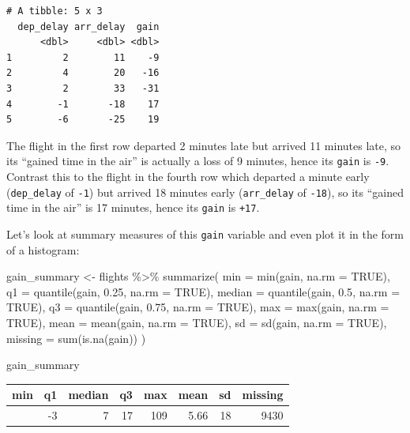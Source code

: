 \documentclass[
  letterpaper,
  DIV=11,
  numbers=noendperiod]{scrreprt}
\newenvironment{Shaded}{\begin{snugshade}}{\end{snugshade}}
\newcommand{\AttributeTok}[1]{\textcolor[rgb]{0.40,0.45,0.13}{#1}}
\newcommand{\ConstantTok}[1]{\textcolor[rgb]{0.56,0.35,0.01}{#1}}
\newcommand{\FloatTok}[1]{\textcolor[rgb]{0.68,0.00,0.00}{#1}}
\newcommand{\FunctionTok}[1]{\textcolor[rgb]{0.28,0.35,0.67}{#1}}
\newcommand{\NormalTok}[1]{\textcolor[rgb]{0.00,0.23,0.31}{#1}}
\newcommand{\OtherTok}[1]{\textcolor[rgb]{0.00,0.23,0.31}{#1}}
\newcommand{\SpecialCharTok}[1]{\textcolor[rgb]{0.37,0.37,0.37}{#1}}
\theoremstyle{definition}
\theoremstyle{remark}
\begin{document}
\begin{verbatim}
# A tibble: 5 x 3
  dep_delay arr_delay  gain
      <dbl>     <dbl> <dbl>
1         2        11    -9
2         4        20   -16
3         2        33   -31
4        -1       -18    17
5        -6       -25    19
\end{verbatim}

The flight in the first row departed 2 minutes late but arrived 11
minutes late, so its ``gained time in the air'' is actually a loss of 9
minutes, hence its \texttt{gain} is \texttt{-9}. Contrast this to the
flight in the fourth row which departed a minute early
(\texttt{dep\_delay} of \texttt{-1}) but arrived 18 minutes early
(\texttt{arr\_delay} of \texttt{-18}), so its ``gained time in the air''
is 17 minutes, hence its \texttt{gain} is \texttt{+17}.

Let's look at summary measures of this \texttt{gain} variable and even
plot it in the form of a histogram:

\begin{Shaded}
\begin{Highlighting}[]
\NormalTok{gain\_summary }\OtherTok{\textless{}{-}}\NormalTok{ flights }\SpecialCharTok{\%\textgreater{}\%} 
  \FunctionTok{summarize}\NormalTok{(}
    \AttributeTok{min =} \FunctionTok{min}\NormalTok{(gain, }\AttributeTok{na.rm =} \ConstantTok{TRUE}\NormalTok{),}
    \AttributeTok{q1 =} \FunctionTok{quantile}\NormalTok{(gain, }\FloatTok{0.25}\NormalTok{, }\AttributeTok{na.rm =} \ConstantTok{TRUE}\NormalTok{),}
    \AttributeTok{median =} \FunctionTok{quantile}\NormalTok{(gain, }\FloatTok{0.5}\NormalTok{, }\AttributeTok{na.rm =} \ConstantTok{TRUE}\NormalTok{),}
    \AttributeTok{q3 =} \FunctionTok{quantile}\NormalTok{(gain, }\FloatTok{0.75}\NormalTok{, }\AttributeTok{na.rm =} \ConstantTok{TRUE}\NormalTok{),}
    \AttributeTok{max =} \FunctionTok{max}\NormalTok{(gain, }\AttributeTok{na.rm =} \ConstantTok{TRUE}\NormalTok{),}
    \AttributeTok{mean =} \FunctionTok{mean}\NormalTok{(gain, }\AttributeTok{na.rm =} \ConstantTok{TRUE}\NormalTok{),}
    \AttributeTok{sd =} \FunctionTok{sd}\NormalTok{(gain, }\AttributeTok{na.rm =} \ConstantTok{TRUE}\NormalTok{),}
    \AttributeTok{missing =} \FunctionTok{sum}\NormalTok{(}\FunctionTok{is.na}\NormalTok{(gain))}
\NormalTok{  )}

\NormalTok{gain\_summary}
\end{Highlighting}
\end{Shaded}

\begin{longtable}[]{@{}rrrrrrrr@{}}
\toprule\noalign{}
min & q1 & median & q3 & max & mean & sd & missing \\
\midrule\noalign{}
\endhead
\bottomrule\noalign{}
\endlastfoot
-196 & -3 & 7 & 17 & 109 & 5.66 & 18 & 9430 \\
\end{longtable}
\end{document}

